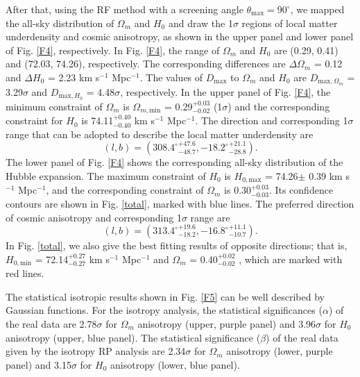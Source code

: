 \documentclass{aa}
\begin{document}
After that, using the RF method with a screening angle $\theta_\mathrm{max} = 90^{\circ}$, we mapped the all-sky distribution of $\Omega_{m}$ and $H_{0}$ and draw the 1$\sigma$ regions of local matter underdensity and cosmic anisotropy, as shown in the upper panel and lower panel of Fig. \ref{F4}, respectively. In Fig. \ref{F4}, the range of $\Omega_{m}$ and $H_{0}$ are (0.29, 0.41) and (72.03, 74.26), respectively. The corresponding differences are $\Delta \Omega_{m}$ = 0.12 and $\Delta H_{0}$ = 2.23 km s$^{-1}$ Mpc$^{-1}$. The values of $D_\mathrm{max}$ to $\Omega_{m}$ and $H_{0}$ are $D_{\mathrm{max},\Omega_{m}}$ = 3.29$\sigma$ and $D_{\mathrm{max}, H_{0}}$ = 4.48$\sigma$, respectively. In the upper panel of Fig. \ref{F4}, the minimum constraint of $\Omega_{m}$ is $\Omega_{m, \mathrm{min}}$ = 0.29$^{+0.03}_{-0.02}$ (1$\sigma$) and the corresponding constraint for $H_{0}$ is 74.11$^{+0.40}_{-0.40}$ km s$^{-1}$ Mpc$^{-1}$. The direction and corresponding 1$\sigma$ range that can be adopted to describe the local matter underdensity are 
\begin{equation}
        (l, b) = ({308.4^{\circ}}_{-48.7}^{+47.6}, {-18.2^{\circ}}_{-28.8}^{+21.1}).
        \label{lbF4}
\end{equation}
The lower panel of Fig. \ref{F4} shows the corresponding all-sky distribution of the Hubble expansion. The maximum constraint of $H_{0}$ is $H_{0,\mathrm{max}}$ = 74.26$\pm$ 0.39 km s$^{-1}$ Mpc$^{-1}$, and the corresponding constraint of $\Omega_{m}$ is 0.30$^{+0.03}_{-0.03}$. Its confidence contours are shown in Fig. \ref{total}, marked with blue lines. The preferred direction of cosmic anisotropy and corresponding 1$\sigma$ range are
\begin{equation}
        (l, b) = ({313.4^{\circ}}_{-18.2}^{+19.6}, {-16.8^{\circ}}_{-10.7}^{+11.1}).
        \label{lbF4H}
\end{equation} 
In Fig. \ref{total}, we also give the best fitting results of opposite directions; that is, $H_{0, \mathrm{min}}$ = 72.14$^{+0.27}_{-0.27}$ km s$^{-1}$ Mpc$^{-1}$ and $\Omega_{m}$ = 0.40$^{+0.02}_{-0.02}$ , which are marked with red lines.

The statistical isotropic results shown in Fig. \ref{F5} can be well described by Gaussian functions. For the isotropy analysis, the statistical significances ($\alpha$) of the real data are 2.78$\sigma$ for $\Omega_{m}$ anisotropy (upper, purple panel) and 3.96$\sigma$ for $H_{0}$ anisotropy (upper, blue panel). The statistical significance ($\beta$) of the real data given by the isotropy RP analysis are 2.34$\sigma$ for $\Omega_{m}$ anisotropy (lower, purple panel) and 3.15$\sigma$ for $H_{0}$ anisotropy (lower, blue panel).
\end{document}
